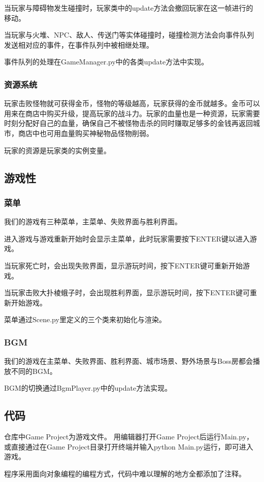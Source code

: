 \documentclass{ctexart}
\begin{document}
当玩家与障碍物发生碰撞时，玩家类中的update方法会撤回玩家在这一帧进行的移动。

当玩家与火堆、NPC、敌人、传送门等实体碰撞时，碰撞检测方法会向事件队列发送相对应的事件，在事件队列中被相继处理。

事件队列的处理在GameManager.py中的各类update方法中实现。

\subsubsection{资源系统}
玩家击败怪物就可获得金币，怪物的等级越高，玩家获得的金币就越多。金币可以用来在商店中购买升级，提高玩家的战斗力。玩家的血量也是一种资源，玩家需要时刻分配好自己的血量，确保自己不被怪物击杀的同时赚取足够多的金钱再返回城市，商店中也可用血量购买神秘物品怪物削弱。

玩家的资源是玩家类的实例变量。

\subsection{游戏性}
\subsubsection{菜单}
我们的游戏有三种菜单，主菜单、失败界面与胜利界面。

进入游戏与游戏重新开始时会显示主菜单，此时玩家需要按下ENTER键以进入游戏。

当玩家死亡时，会出现失败界面，显示游玩时间，按下ENTER键可重新开始游戏。

当玩家击败大扑棱蛾子时，会出现胜利界面，显示游玩时间，按下ENTER键可重新开始游戏。

菜单通过Scene.py里定义的三个类来初始化与渲染。

\subsubsection{BGM}
我们的游戏在主菜单、失败界面、胜利界面、城市场景、野外场景与Boss房都会播放不同的BGM。

BGM的切换通过BgmPlayer.py中的update方法实现。

\subsection{代码}
仓库中Game Project为游戏文件。
用编辑器打开Game Project后运行Main.py，或直接通过在Game Project目录打开终端并输入python Main.py运行，即可进入游戏。

程序采用面向对象编程的编程方式，代码中难以理解的地方全都添加了注释。
\end{document}
